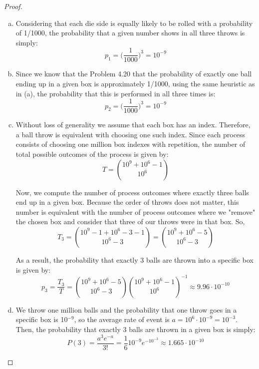 \begin{proof}
    \hfill
    \begin{enumerate}[(a)]
        \item Considering that each die side is equally likely to be rolled
            with a probability of 1/1000, the probability that a given
            number shows in all three throws is simply:
            \[
                p_1 = \bigg(\frac{1}{1000}\bigg)^3 = 10^{-9}
            \] 

        \item Since we know that the Problem 4.20 that the probability
            of exactly one ball ending up in a given box is approximately
            1/1000, using the same heuristic as in (a), the probability
            that this is performed in all three times is:
            \[
                p_2 = \bigg(\frac{1}{1000}\bigg)^3 = 10^{-9}
            \] 
        \item Without loss of generality we assume that each box has an 
            index. Therefore, a ball throw is equivalent with choosing
            one such index. Since each process consists of choosing one
            million box indexes with repetition, the number of total possible outcomes
            of the process is given by:
            \[
                T = \binom{10^9 + 10^6 - 1}{10^6}
            \] 

            Now, we compute the number of process outcomes where exactly
            three balls end up in a given box. Because the order of throws
            does not matter, this number is equivalent with the number of process outcomes 
            where we "remove" the chosen box and consider that three of our throws were in that box.
            So,
            \[
                T_3 = \binom{10^9 - 1 + 10^6 - 3 - 1}{10^6 - 3} = \binom{10^9 + 10^6 - 5}{10^6 - 3}
            \] 

            As a result, the probability that exactly 3 balls are thrown into a specific
            box is given by:
            \[
                p_3 = \frac{T_3}{T} = \binom{10^9 + 10^6 - 5}{10^6 - 3} \binom{10^9 + 10^6 - 1}{10^6}^{-1}
                    \approx 9.96 \cdot 10^{-10}
            \] 

        \item We throw one million balls and the probability that one throw goes in a specific box
            is 10$^{-9}$, so the average rate of event is $a = 10^6 \cdot 10^{-9} = 10^{-3}$.
            Then, the probability that exactly 3 balls are thrown in a given box is simply:
            \[
                P(3) = \frac{a^3 e^{-a}}{3!} = \frac{1}{6} 10^{-9} e^{-10^{-3}} \approx 1.665 \cdot 10^{-10}
            \] 
    \end{enumerate}
\end{proof}

